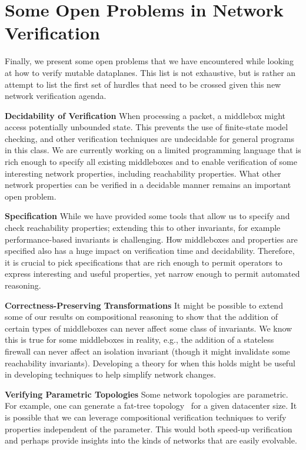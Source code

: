 \section{Some Open Problems in Network Verification}
Finally, we present some open problems that we have encountered while looking at how to verify mutable dataplanes. This list is not 
exhaustive, but is rather an attempt to list the first set of hurdles that need to be crossed given this new network verification agenda.

\noindent\textbf{Decidability of Verification} When processing a packet, a middlebox might access potentially unbounded state. This prevents the use
of finite-state model checking, and other verification techniques are undecidable for general programs in this class. We are
currently working on a limited programming language that is rich enough to specify all existing middleboxes and to enable verification of some interesting network properties, including reachability properties. What other network properties can
be verified in a decidable manner remains an important open problem.

\noindent\textbf{Specification} While we have provided some tools
that allow us to specify and check reachability properties; extending this to other invariants, for example performance-based
invariants is challenging. How middleboxes and properties are specified also has a huge impact on verification time and
decidability. Therefore, it is crucial to pick specifications that are rich enough to permit operators to express interesting and
useful properties, yet narrow enough to permit automated reasoning.

\noindent\textbf{Correctness-Preserving Transformations} It might be possible to extend some of our results on compositional reasoning to show that the addition of certain types of middleboxes
can never affect some class of invariants. We know this is true for some middleboxes in reality, e.g., the addition of a stateless firewall
can never affect an isolation invariant (though it might invalidate some reachability invariants). Developing a theory for when this 
holds might be useful in developing techniques to help simplify network changes. 

\noindent\textbf{Verifying Parametric Topologies}
Some network topologies are parametric. For example, one can generate a fat-tree topology~\cite{al2008scalable} for a given datacenter
size. It is possible that we can leverage compositional verification techniques to verify properties independent of the parameter. This
would both speed-up verification and perhaps provide insights into the kinds of networks that are easily evolvable.